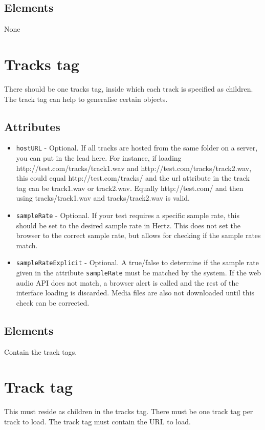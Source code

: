 \documentclass{article}
\begin{document}
\subsection{Elements}
None

\section{Tracks tag}

There should be one tracks tag, inside which each track is specified as children. The track tag can help to generalise certain objects.

\subsection{Attributes}
\begin{itemize}
\item \texttt{hostURL} - Optional. If all tracks are hosted from the same folder on a server, you can put in the lead here. For instance, if loading http://test.com/tracks/track1.wav and http://test.com/tracks/track2.wav, this could equal http://test.com/tracks/ and the url attribute in the track tag can be track1.wav or track2.wav. Equally http://test.com/ and then using tracks/track1.wav and tracks/track2.wav is valid.
\item \texttt{sampleRate} - Optional. If your test requires a specific sample rate, this should be set to the desired sample rate in Hertz. This does not set the browser to the correct sample rate, but allows for checking if the sample rates match.
\item \texttt{sampleRateExplicit} - Optional. A true/false to determine if the sample rate given in the attribute \texttt{sampleRate} must be matched by the system. If the web audio API does not match, a browser alert is called and the rest of the interface loading is discarded. Media files are also not downloaded until this check can be corrected.
\end{itemize}

\subsection{Elements}
Contain the track tags.

\section{Track tag}

This must reside as children in the tracks tag. There must be one track tag per track to load. The track tag must contain the URL to load.
\end{document}
